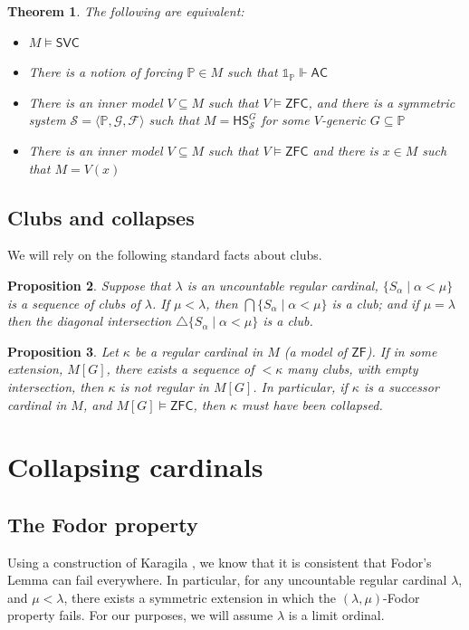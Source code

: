\documentclass[a4paper,11pt]{amsart}
\newtheorem{theorem}{Theorem}[section]
\newtheorem{prop}[theorem]{Proposition}
\theoremstyle{definition}
\newcommand{\p}{\mathbb{P}}
\newcommand{\AC}{\mathsf{AC}}
\newcommand{\ZF}{\mathsf{ZF}}
\newcommand{\ZFC}{\mathsf{ZFC}}
\newcommand{\HS}{\mathsf{HS}}
\newcommand{\SVC}{\mathsf{SVC}}
\begin{document}
\begin{theorem}\label{svc-equivalences}
    The following are equivalent: 
    \begin{itemize}
        \item $M \models \SVC$
        \item There is a notion of forcing $\p \in M$ such that $\mathds{1}_\p \Vdash \AC$
        \item There is an inner model $V \subseteq M$ such that $V \models \ZFC$, and there is a symmetric system $\mathscr{S} = \langle \p, \mathscr{G}, \mathscr{F} \rangle$ such that $M = \HS^G_\mathscr{S}$ for some $V$-generic $G \subseteq \p$
        \item There is an inner model $V \subseteq M$ such that $V \models \ZFC$ and there is $x \in M$ such that $M = V(x)$
        
    \end{itemize}
\end{theorem}

\subsection{Clubs and collapses}

We will rely on the following standard facts about clubs.

\begin{prop}
    Suppose that $\lambda$ is an uncountable regular cardinal, $\{S_\alpha \mid \alpha < \mu\}$ is a sequence of clubs of $\lambda$. If $\mu < \lambda$, then $\bigcap\{S_\alpha \mid \alpha < \mu\}$ is a club; and if $\mu = \lambda$ then the diagonal intersection $\triangle\{S_\alpha \mid \alpha < \mu\}$ is a club.
\end{prop}


\begin{prop}\label{collapse}
    Let $\kappa$ be a regular cardinal in $M$ (a model of $\ZF$). If in some extension, $M[G]$, there exists a sequence of $<\kappa$ many clubs, with empty intersection, then $\kappa$ is not regular in $M[G]$. In particular, if $\kappa$ is a successor cardinal in $M$, and $M[G] \models \ZFC$, then $\kappa$ must have been collapsed. 
\end{prop}

\section{Collapsing cardinals}


\subsection{The Fodor property}
Using a construction of Karagila \cite{karagila-fodor}, we know that it is consistent that Fodor's Lemma can fail everywhere. In particular, for any uncountable regular cardinal $\lambda$, and $\mu < \lambda$, there exists a symmetric extension in which the $(\lambda, \mu)$-Fodor property fails. For our purposes, we will assume $\lambda$ is a limit ordinal. 
\end{document}
